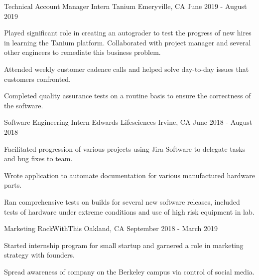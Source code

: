 

\begin{cventries}

  \cventry
    {Technical Account Manager Intern} %
    {Tanium} %
    {Emeryville, CA} %
    {June 2019 - August 2019} %
    {
      \begin{cvitems} %
        \item {Played significant role in creating an autograder to test the progress of new hires in learning the Tanium platform. Collaborated with project manager and several other engineers to remediate this business problem.}
        \item {Attended weekly customer cadence calls and helped solve day-to-day issues that customers confronted.}
        \item {Completed quality assurance tests on a routine basis to ensure the correctness of the software.}
      \end{cvitems}
    }

  \cventry
    {Software Engineering Intern} %
    {Edwards Lifesciences} %
    {Irvine, CA} %
    {June 2018 - August 2018} %
    {
      \begin{cvitems} %
        \item {Facilitated progression of various projects using Jira Software to delegate tasks and bug fixes to team.}
        \item {Wrote application to automate documentation for various manufactured hardware parts.}
        \item {Ran comprehensive tests on builds for several new software releases, included tests of hardware under extreme conditions and use of high risk equipment in lab.}
      \end{cvitems}
    }

  \cventry
    {Marketing} %
    {RockWithThis} %
    {Oakland, CA} %
    {September 2018 - March 2019} %
    {
      \begin{cvitems} %
        \item {Started internship program for small startup and garnered a role in marketing strategy with founders.}
        \item {Spread awareness of company on the Berkeley campus via control of social media.}
      \end{cvitems}
    }

\end{cventries}
